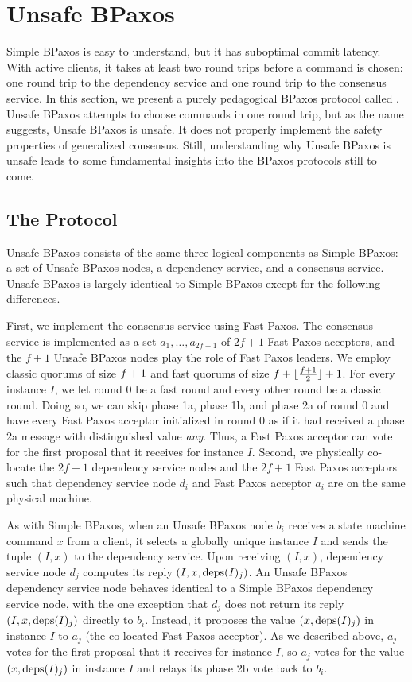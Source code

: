 \section{Unsafe BPaxos}
Simple BPaxos is easy to understand, but it has suboptimal commit latency.
With active clients, it takes at least two round trips before a command is
chosen: one round trip to the dependency service and one round trip to the
consensus service. In this section, we present a purely pedagogical BPaxos
protocol called . Unsafe BPaxos attempts to choose
commands in one round trip, but as the name suggests, Unsafe BPaxos is unsafe.
It does not properly implement the safety properties of generalized consensus.
Still, understanding why Unsafe BPaxos is unsafe leads to some fundamental
insights into the BPaxos protocols still to come.

\subsection{The Protocol}
Unsafe BPaxos consists of the same three logical components as Simple
BPaxos: a set of Unsafe BPaxos nodes, a dependency service, and a consensus
service. Unsafe BPaxos is largely identical to Simple BPaxos except for the
following differences.

First, we implement the consensus service using Fast Paxos. The consensus
service is implemented as a set $a_1, \ldots, a_{2f + 1}$ of $2f + 1$ Fast
Paxos acceptors, and the $f + 1$ Unsafe BPaxos nodes play the role of Fast
Paxos leaders. We employ classic quorums of size $f + 1$ and fast quorums
of size $f + \lfloor\frac{f + 1}{2}\rfloor + 1$. For every instance $I$, we let round $0$ be a fast
round and every other round be a classic round. Doing so, we can skip phase 1a,
phase 1b, and phase 2a of round $0$ and have every Fast Paxos acceptor
initialized in round $0$ as if it had received a phase 2a message with
distinguished value \emph{any}. Thus, a Fast Paxos acceptor can vote for the
first proposal that it receives for instance $I$.
%
Second, we physically co-locate the $2f + 1$ dependency service nodes and the
$2f + 1$ Fast Paxos acceptors such that dependency service node $d_i$ and Fast
Paxos acceptor $a_i$ are on the same physical machine.

As with Simple BPaxos, when an Unsafe BPaxos node $b_i$ receives a state
machine command $x$ from a client, it selects a globally unique instance $I$
and sends the tuple $(I, x)$ to the dependency service. Upon receiving $(I,
x)$, dependency service node $d_j$ computes its reply $(I, x, \text{deps}(I)_j)$.  An
Unsafe BPaxos dependency service node behaves identical to a Simple BPaxos
dependency service node, with the one exception that $d_j$ does not return its
reply $(I, x, \text{deps}(I)_j)$ directly to $b_i$. Instead, it proposes the value
$(x, \text{deps}(I)_j)$ in instance $I$ to $a_j$ (the co-located Fast Paxos
acceptor). As we described above, $a_j$ votes for the first proposal that it
receives for instance $I$, so $a_j$ votes for the value $(x, \text{deps}(I)_j)$ in
instance $I$ and relays its phase 2b vote back to $b_i$.

